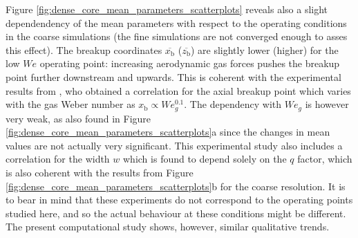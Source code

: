 Figure \ref{fig:dense_core_mean_parameters_scatterplots} reveals also a slight dependendency of the mean parameters with respect to the operating conditions in the coarse simulations (the fine simulations are not converged enough to asses this effect). The breakup coordinates $\overline{x_\mathrm{b}}$ ($\overline{z_\mathrm{b}}$) are slightly lower (higher) for the low $We$ operating point: increasing aerodynamic gas forces pushes the breakup point further downstream and upwards. This is coherent with the experimental results from , who obtained a correlation for the axial breakup point which varies with the gas Weber number as $x_\mathrm{b} \propto We_g^{0.1}$. The dependency with $We_g$ is however very weak, as also found in Figure \ref{fig:dense_core_mean_parameters_scatterplots}a since the changes in mean values are not actually very significant. This experimental study also includes a correlation for the width $w$ which is found to depend solely on the $q$ factor, which is also coherent with the results from Figure \ref{fig:dense_core_mean_parameters_scatterplots}b for the coarse resolution. It is to bear in mind that these experiments do not correspond to the operating points studied here, and so the actual behaviour at these conditions might be different. The present computational study shows, however, similar qualitative trends. 


